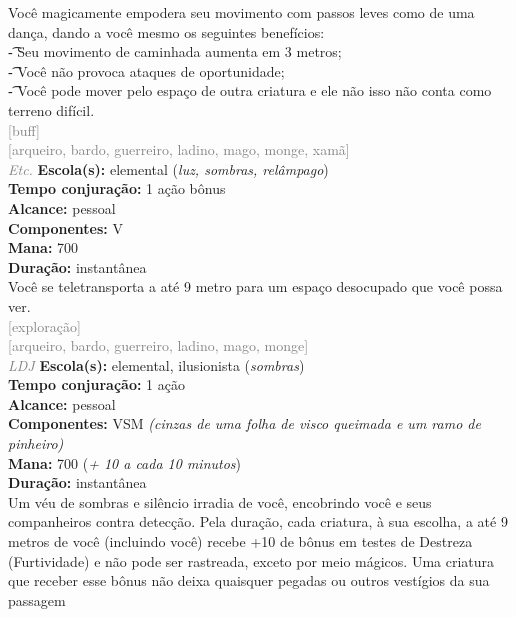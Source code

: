 \documentclass{RPG_Adventure}[2021/10/20]
\begin{document}
{\normalsize Você magicamente empodera seu movimento com passos leves como de uma dança, dando a você mesmo os seguintes benefícios:\\\t - Seu movimento de caminhada aumenta em 3 metros;\\\t - Você não provoca ataques de oportunidade;\\\t - Você pode mover pelo espaço de outra criatura e ele não isso não conta como terreno difícil.\\}
{\scriptsize \textcolor{gray}{[buff]\\}}
{\scriptsize \textcolor{gray}{[arqueiro, bardo, guerreiro, ladino, mago, monge, xamã]\\}}
{\tiny \textcolor{gray}{\textit{Etc.}}}\jump{}
{\small \t \textbf{Escola(s):} elemental (\textit{luz, sombras, relâmpago})\\\t \textbf{Tempo conjuração:} 1 ação bônus\\\t \textbf{Alcance:} pessoal\\\t \textbf{Componentes:} V\\\t \textbf{Mana:} 700\\\t \textbf{Duração:} instantânea\\}
{\normalsize Você se teletransporta a até 9 metro para um espaço desocupado que você possa ver.\\}
{\scriptsize \textcolor{gray}{[exploração]\\}}
{\scriptsize \textcolor{gray}{[arqueiro, bardo, guerreiro, ladino, mago, monge]\\}}
{\tiny \textcolor{gray}{\textit{LDJ}}}\jump{}
{\small \t \textbf{Escola(s):} elemental, ilusionista (\textit{sombras})\\\t \textbf{Tempo conjuração:} 1 ação\\\t \textbf{Alcance:} pessoal\\\t \textbf{Componentes:} VSM \textit{(cinzas de uma folha de visco queimada e um ramo de pinheiro)}\\\t \textbf{Mana:} 700 (\textit{+ 10 a cada 10 minutos})\\\t \textbf{Duração:} instantânea\\}
{\normalsize Um véu de sombras e silêncio irradia de você, encobrindo você e seus companheiros contra detecção. Pela duração, cada criatura, à sua escolha, a até 9 metros de você (incluindo você) recebe +10 de bônus em testes de Destreza (Furtividade) e não pode ser rastreada, exceto por meio mágicos. Uma criatura que receber esse bônus não deixa quaisquer pegadas ou outros vestígios da sua passagem\\}
\end{document}
